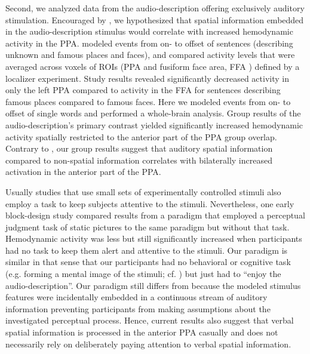 \documentclass[english]{article}
\begin{document}
Second, we analyzed data from the audio-description offering exclusively
auditory stimulation.
Encouraged by \citep{aziz2008modulation}, we hypothesized that spatial
information embedded in the audio-description stimulus would correlate with increased
hemodynamic activity in the PPA.
\citep{aziz2008modulation} modeled events from on- to offset of sentences
(describing unknown and famous places and faces), and compared activity levels
that were averaged across voxels of ROIs (PPA and fusiform face area, FFA
\citep{kanwisher1997ffa}) defined by a localizer experiment.
Study results revealed significantly decreased activity in only the left PPA
compared to activity in the FFA for sentences describing famous places compared
to famous faces.
Here we modeled events from on- to offset of single words and performed a
whole-brain analysis.
Group results of the audio-description's primary contrast yielded significantly
increased hemodynamic activity spatially restricted to the anterior part of the
PPA group overlap.
Contrary to \citep{aziz2008modulation}, our group results suggest that auditory
spatial information compared to non-spatial information correlates with
bilaterally increased activation in the anterior part of the PPA.

Usually studies that use small sets of experimentally controlled stimuli also
employ a task to keep subjects attentive to the stimuli.
Nevertheless, one early block-design study \citep{epstein1998ppa} compared
results from a paradigm that employed a perceptual judgment task of static
pictures to the same paradigm but without that task.
Hemodynamic activity was less but still significantly increased when
participants had no task to keep them alert and attentive to the stimuli.
Our paradigm is similar in that sense that our participants had no behavioral or
cognitive task (e.g. forming a mental image of the stimuli; cf.
\citep{ocraven2000mental})  but just had to ``enjoy the audio-description''.
Our paradigm still differs from \citep{epstein1998ppa} because the modeled
stimulus features were incidentally embedded in a continuous stream of auditory
information preventing participants from making assumptions about the
investigated perceptual process.
Hence, current results also suggest that verbal spatial information is processed
in the anterior PPA casually and does not necessarily rely on deliberately
paying attention to verbal spatial information.
\end{document}
